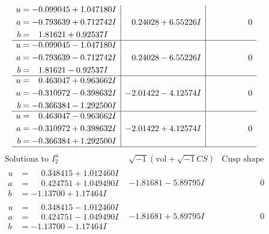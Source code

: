 \documentclass[1p]{elsarticle_modified}
\theoremstyle{definition}
\newcommand{\I}{\sqrt{-1}}
\begin{document}
$$\begin{array}{c|c|c}
\begin{aligned}
u &= -0.099045 + 1.047180 I \\
a &= -0.793639 + 0.712742 I \\
b &= \phantom{-}1.81621 + 0.92537 I\end{aligned}
 & \phantom{-}0.24028 + 6.55226 I & \phantom{-0.000000 } 0 \\ \hline\begin{aligned}
u &= -0.099045 - 1.047180 I \\
a &= -0.793639 - 0.712742 I \\
b &= \phantom{-}1.81621 - 0.92537 I\end{aligned}
 & \phantom{-}0.24028 - 6.55226 I & \phantom{-0.000000 } 0 \\ \hline\begin{aligned}
u &= \phantom{-}0.463047 + 0.963662 I \\
a &= -0.310972 - 0.398632 I \\
b &= -0.366384 - 1.292500 I\end{aligned}
 & -2.01422 - 4.12574 I & \phantom{-0.000000 } 0 \\ \hline\begin{aligned}
u &= \phantom{-}0.463047 - 0.963662 I \\
a &= -0.310972 + 0.398632 I \\
b &= -0.366384 + 1.292500 I\end{aligned}
 & -2.01422 + 4.12574 I & \phantom{-0.000000 } 0\\
 \hline 
 \end{array}$$\newpage$$\begin{array}{c|c|c}  
\text{Solutions to }I^u_{2}& \I (\text{vol} + \sqrt{-1}CS) & \text{Cusp shape}\\
 \hline 
\begin{aligned}
u &= \phantom{-}0.348415 + 1.012460 I \\
a &= \phantom{-}0.424751 + 1.049490 I \\
b &= -1.13700 + 1.17464 I\end{aligned}
 & -1.81681 - 5.89795 I & \phantom{-0.000000 } 0 \\ \hline\begin{aligned}
u &= \phantom{-}0.348415 - 1.012460 I \\
a &= \phantom{-}0.424751 - 1.049490 I \\
b &= -1.13700 - 1.17464 I\end{aligned}
 & -1.81681 + 5.89795 I & \phantom{-0.000000 } 0 \\ \hline\begin{aligned}

\end{aligned}
\end{array}$$
\end{document}
